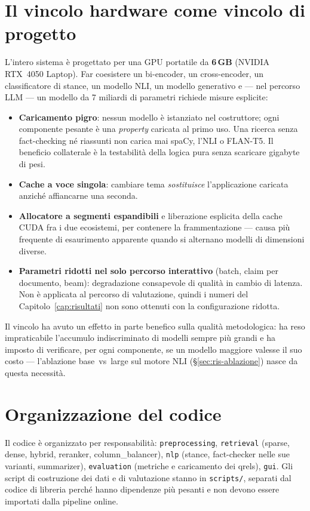 \documentclass[11pt,a4paper]{report}
\begin{document}
\section{Il vincolo hardware come vincolo di progetto}\label{sec:memoria}
L'intero sistema è progettato per una GPU portatile da \textbf{6\,GB} (NVIDIA RTX~4050 Laptop).
Far coesistere un bi-encoder, un cross-encoder, un classificatore di stance, un modello NLI, un
modello generativo e --- nel percorso LLM --- un modello da 7 miliardi di parametri richiede
misure esplicite:

\begin{itemize}[leftmargin=*]
  \item \textbf{Caricamento pigro}: nessun modello è istanziato nel costruttore; ogni componente
        pesante è una \emph{property} caricata al primo uso. Una ricerca senza fact-checking né
        riassunti non carica mai spaCy, l'NLI o FLAN-T5. Il beneficio collaterale è la
        testabilità della logica pura senza scaricare gigabyte di pesi.
  \item \textbf{Cache a voce singola}: cambiare tema \emph{sostituisce} l'applicazione caricata
        anziché affiancarne una seconda.
  \item \textbf{Allocatore a segmenti espandibili} e liberazione esplicita della cache CUDA fra
        i due ecosistemi, per contenere la frammentazione --- causa più frequente di
        esaurimento apparente quando si alternano modelli di dimensioni diverse.
  \item \textbf{Parametri ridotti nel solo percorso interattivo} (batch, claim per documento,
        beam): degradazione consapevole di qualità in cambio di latenza. Non è applicata al
        percorso di valutazione, quindi i numeri del Capitolo~\ref{cap:risultati} non sono
        ottenuti con la configurazione ridotta.
\end{itemize}

Il vincolo ha avuto un effetto in parte benefico sulla qualità metodologica: ha reso
impraticabile l'accumulo indiscriminato di modelli sempre più grandi e ha imposto di verificare,
per ogni componente, se un modello maggiore valesse il suo costo --- l'ablazione base~vs~large
sul motore NLI (\S\ref{sec:ris-ablazione}) nasce da questa necessità.

\section{Organizzazione del codice}
Il codice è organizzato per responsabilità: \texttt{preprocessing}, \texttt{retrieval}
(sparse, dense, hybrid, reranker, column\_balancer), \texttt{nlp} (stance, fact-checker nelle
sue varianti, summarizer), \texttt{evaluation} (metriche e caricamento dei qrels),
\texttt{gui}. Gli script di costruzione dei dati e di valutazione stanno in \texttt{scripts/},
separati dal codice di libreria perché hanno dipendenze più pesanti e non devono essere
importati dalla pipeline online.
\end{document}
